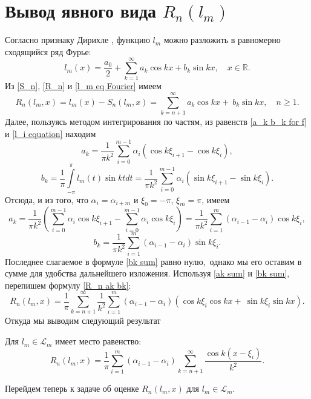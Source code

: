 \section{Вывод явного вида $R_n(l_m)$}
Согласно признаку Дирихле \cite[c.438]{fiht_diff_v3}, функцию $l_m$ можно разложить в равномерно сходящийся ряд Фурье:
\begin{equation}
l_m(x) = \frac{a_0}{2} + \sum\limits_{k=1}^{\infty} a_k \cos kx + b_k \sin
kx, \quad x \in \mathbb{R}. \label{l_m eq Fourier}
\end{equation}
Из \eqref{S_n}, \eqref{R_n} и \eqref{l_m eq Fourier} имеем
\begin{equation}
R_n(l_m,x) = l_m(x) - S_n(l_m,x) = \sum\limits_{k=n+1}^{\infty} a_k \cos kx +\ b_k \sin kx, \quad n \geq 1.\label{R_n ak bk}
\end{equation}
Далее, пользуясь методом интегрирования по частям, из равенств \eqref{a_k b_k for f} и \eqref{l_i equation} находим
\begin{equation}
a_k = \frac1{\pi k^2} \sum\limits_{i=0}^{m-1} \alpha_i(\cos k\xi_{i+1} - \cos k \xi_i),
\end{equation}
\begin{equation}
b_k = \frac1\pi\int\limits_{-\pi}^{\pi} l_m(t) \sin kt dt = \frac1{\pi k^2}\sum_{i=0}^{m-1}\alpha_i(\sin k \xi_{i+1} - \sin k \xi_i).
\end{equation}
Отсюда, и из того, что $\alpha_i = \alpha_{i+m}$ и $\xi_0 = -\pi$, $\xi_m = \pi$, имеем
\begin{equation}
a_k = \frac1{\pi k^2}
\left(\sum\limits_{i=0}^{m-1} \alpha_i\cos k\xi_{i+1} - \sum\limits_{i=0}^{m-1} \alpha_i\cos k \xi_i\right)
 = \frac{1}{\pi k^2} \sum\limits_{i=1}^{m} (\alpha_{i-1}-\alpha_i) \cos k \xi_i,\label{ak sum}
\end{equation}
\begin{equation}
b_k = \frac{1}{\pi k^2} \sum\limits_{i=1}^{m} (\alpha_{i-1} - \alpha_i)\sin k\xi_i.\label{bk sum}
\end{equation}
Последнее слагаемое в формуле \eqref{bk sum} равно нулю,\ однако мы его оставим в сумме для удобства дальнейшего изложения.
Используя \eqref{ak sum} и \eqref{bk sum}, перепишем формулу \eqref{R_n ak bk}:
\begin{equation}
R_n(l_m,x) = \frac{1}{\pi}\sum\limits_{k=n+1}^{\infty}\frac{1}{k^2}  \sum\limits_{i=1}^{m} (\alpha_{i-1} - \alpha_i)\left(\cos k\xi_i \cos kx +\ \sin k\xi_i \sin kx\right).
\end{equation}
Откуда мы выводим следующий результат
\begin{lemma} \label{lemma R_n}
Для $l_m \in \mathcal{L}_m$ имеет место равенство:
\begin{equation}
R_n(l_m,x) = \frac{1}{\pi}\sum\limits_{i=1}^{m}(\alpha_{i-1}-\alpha_i)\sum\limits_{k=n+1}^{\infty}\frac{\cos k(x - \xi_i)}{k^2}.\label{R_n formula}
\end{equation}
\end{lemma}
Перейдем теперь к задаче об оценке $R_n(l_m,x)$ для $l_m \in \mathcal{L}_m$.

